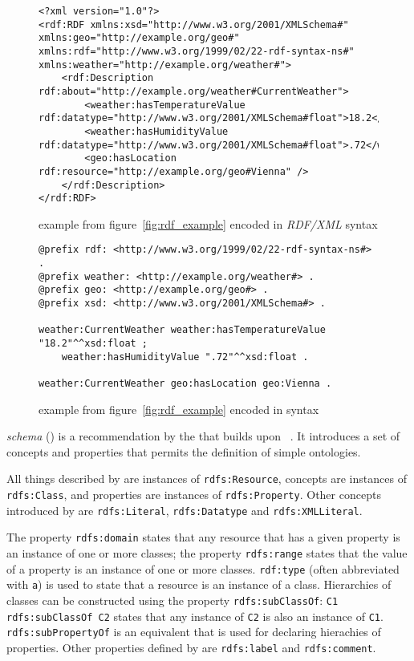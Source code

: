 \begin{figure} %
\begin{lstlisting}
<?xml version="1.0"?>
<rdf:RDF xmlns:xsd="http://www.w3.org/2001/XMLSchema#" xmlns:geo="http://example.org/geo#" xmlns:rdf="http://www.w3.org/1999/02/22-rdf-syntax-ns#" xmlns:weather="http://example.org/weather#">
	<rdf:Description rdf:about="http://example.org/weather#CurrentWeather">
		<weather:hasTemperatureValue rdf:datatype="http://www.w3.org/2001/XMLSchema#float">18.2</weather:hasTemperatureValue>
		<weather:hasHumidityValue rdf:datatype="http://www.w3.org/2001/XMLSchema#float">.72</weather:hasHumidityValue>
		<geo:hasLocation rdf:resource="http://example.org/geo#Vienna" />
	</rdf:Description>
</rdf:RDF>
\end{lstlisting}
\caption{ example from figure~\ref{fig:rdf_example} encoded in \emph{RDF/XML} syntax}
\label{fig:rdfxml_example}
\end{figure}

\begin{figure}
\begin{lstlisting}
@prefix rdf: <http://www.w3.org/1999/02/22-rdf-syntax-ns#> .
@prefix weather: <http://example.org/weather#> .
@prefix geo: <http://example.org/geo#> .
@prefix xsd: <http://www.w3.org/2001/XMLSchema#> .

weather:CurrentWeather weather:hasTemperatureValue "18.2"^^xsd:float ;
    weather:hasHumidityValue ".72"^^xsd:float .

weather:CurrentWeather geo:hasLocation geo:Vienna .
\end{lstlisting}
\caption{ example from figure~\ref{fig:rdf_example} encoded in  syntax}
\label{fig:turtle_example}
\end{figure}

 \emph{schema} () is a recommendation by the  that builds upon ~\cite{RDFS}. It introduces a set of concepts and properties that permits the definition of simple ontologies. 

All things described by  are instances of \texttt{rdfs:Resource}, concepts are instances of \texttt{rdfs:Class}, and properties are instances of \texttt{rdfs:Property}. Other concepts introduced by  are \texttt{rdfs:Literal}, \texttt{rdfs:Datatype} and \texttt{rdfs:XMLLiteral}.

The property \texttt{rdfs:domain} states that any resource that has a given property is an instance of one or more classes; the property \texttt{rdfs:range} states that the value of a property is an instance of one or more classes. \texttt{rdf:type} (often abbreviated with \texttt{a}) is used to state that a resource is an instance of a class. Hierarchies of classes can be constructed using the property \texttt{rdfs:subClassOf}: \texttt{C1 rdfs:subClassOf C2} states that any instance of \texttt{C2} is also an instance of \texttt{C1}. \texttt{rdfs:subPropertyOf} is an equivalent that is used for declaring hierachies of properties. Other properties defined by  are \texttt{rdfs:label} and \texttt{rdfs:comment}.

